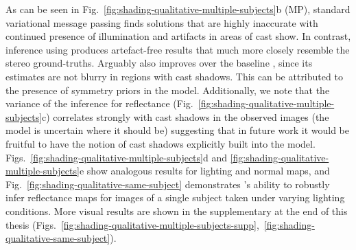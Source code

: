 As can be seen in Fig.~\ref{fig:shading-qualitative-multiple-subjects}b (MP), standard variational message passing finds solutions that are highly inaccurate with continued presence of illumination and artifacts in areas of cast show. In contrast, inference using \MTD produces artefact-free results that much more closely resemble the stereo ground-truths. Arguably \MTD also improves over the baseline \citep{Biswas2009}, since its estimates are not blurry in regions with cast shadows. This can be attributed to the presence of symmetry priors in the model. Additionally, we note that the variance of the \MTD inference for reflectance (Fig.~\ref{fig:shading-qualitative-multiple-subjects}c) correlates strongly with cast shadows in the observed images (\ie the model is uncertain where it should be) suggesting that in future work it would be fruitful to have the notion of cast shadows explicitly built into the model. Figs.~\ref{fig:shading-qualitative-multiple-subjects}d and \ref{fig:shading-qualitative-multiple-subjects}e show analogous results for lighting and normal maps, and Fig.~\ref{fig:shading-qualitative-same-subject} demonstrates \MTD's ability to robustly infer reflectance maps for images of a single subject taken under varying lighting conditions. More visual results are shown in the supplementary at the end of this thesis
(Figs.~\ref{fig:shading-qualitative-multiple-subjects-supp},~\ref{fig:shading-qualitative-same-subject}).

